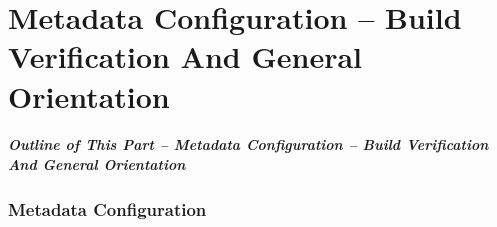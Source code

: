 \begin{comment}
*      ================
*  [[elisp:(org-cycle)][| ]] [[elisp:(org-show-subtree)][|=]] [[elisp:(show-children 10)][|V]] [[elisp:(bx:orgm:indirectBufOther)][|>]] [[elisp:(bx:orgm:indirectBufMain)][|I]] [[elisp:(blee:ppmm:org-mode-toggle)][|N]] [[elisp:(org-top-overview)][|O]] [[elisp:(progn (org-shifttab) (org-content))][|C]] [[elisp:(delete-other-windows)][|1]]  *Part 0*   /Metadata Configuration -- Build Verification And General Orientation/ ::  [[elisp:(org-cycle)][| ]]
\end{comment}

\newpage
\part{Metadata Configuration -- Build Verification And General Orientation}
\label{part:MetadataConfiguration--BuildVerificationAndGeneralOrientation}

\begin{latexonly}
\begin{presentationMode}
\begin{frame}[fragile,plain,label=Part0]
\frametitle{Outline of This Part -- Metadata Configuration -- Build Verification And General Orientation}
\tableofcontents[sectionstyle=show,subsectionstyle=show]
\end{frame}
\end{presentationMode}
\end{latexonly}


\begin{comment}
*  [[elisp:(org-cycle)][| ]] [[elisp:(org-show-subtree)][|=]] [[elisp:(show-children 10)][|V]] [[elisp:(bx:orgm:indirectBufOther)][|>]] [[elisp:(bx:orgm:indirectBufMain)][|I]] [[elisp:(blee:ppmm:org-mode-toggle)][|N]] [[elisp:(org-top-overview)][|O]] [[elisp:(progn (org-shifttab) (org-content))][|C]] [[elisp:(delete-other-windows)][|1]]  /Section/   Metadata Configuration ::  [[elisp:(org-cycle)][| ]]
\end{comment}

\section{Metadata Configuration}




